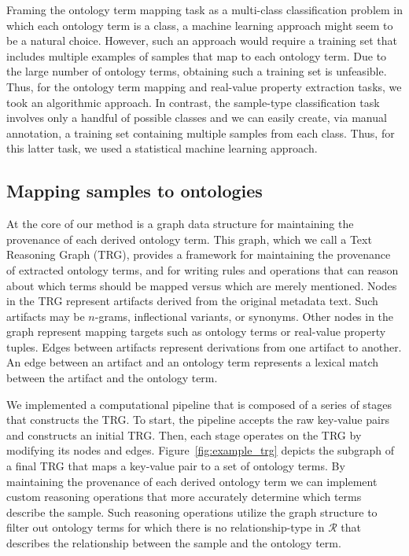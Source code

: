 Framing the ontology term mapping task as a multi-class classification problem in which each ontology term is a class, a machine learning approach might seem to be a natural choice.  However, such an approach would require a training set that includes multiple examples of samples that map to each ontology term.  Due to the large number of ontology terms, obtaining such a training set is unfeasible.  Thus, for the ontology term mapping and real-value property extraction tasks, we took an algorithmic approach.  In contrast, the sample-type classification task involves only a handful of possible classes and we can easily create, via manual annotation, a training set containing multiple samples from each class.  Thus, for this latter task, we used a statistical machine learning approach.

\subsection{Mapping samples to ontologies}

At the core of our method is a graph data structure for maintaining the provenance of each derived ontology term.  This graph, which we call a Text Reasoning Graph (TRG), provides a framework for maintaining the provenance of extracted ontology terms, and for writing rules and operations that can reason about which terms should be mapped versus which are merely mentioned.  Nodes in the TRG represent artifacts derived from the original metadata text. Such artifacts may be $n$-grams, inflectional variants, or synonyms.  Other nodes in the graph represent mapping targets such as ontology terms or real-value property tuples.  Edges between artifacts represent derivations from one artifact to another. An edge between an artifact and an ontology term represents a lexical match between the artifact and the ontology term.  

We implemented a computational pipeline that is composed of a series of stages that constructs the TRG.  To start, the pipeline accepts the raw key-value pairs and constructs an initial TRG. Then, each stage operates on the TRG by modifying its nodes and edges. Figure~\ref{fig:example_trg} depicts the subgraph of a final TRG that maps a key-value pair to a set of ontology terms.   By maintaining the provenance of each derived ontology term we can implement custom reasoning operations that more accurately determine which terms describe the sample.  Such reasoning operations utilize the graph structure to filter out ontology terms for which there is no relationship-type in $\mathcal{R}$ that describes the relationship between the sample and the ontology term.  

